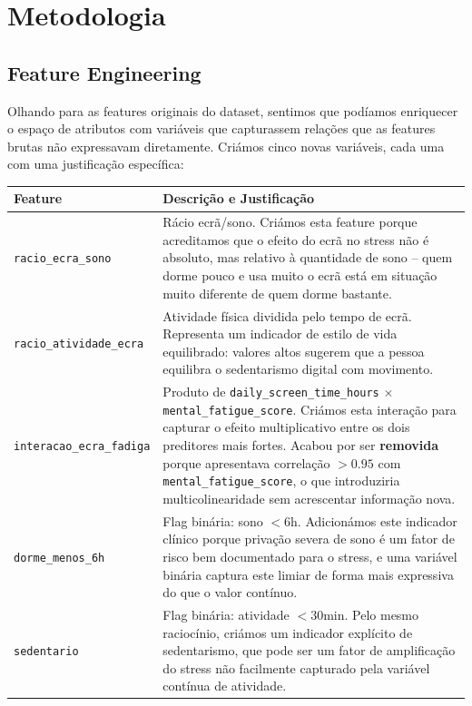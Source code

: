 \documentclass[12pt,a4paper]{article}
\begin{document}
\section{Metodologia}

\subsection{Feature Engineering}

Olhando para as features originais do dataset, sentimos que podíamos enriquecer o espaço
de atributos com variáveis que capturassem relações que as features brutas não expressavam
diretamente. Criámos cinco novas variáveis, cada uma com uma justificação específica:

\begin{longtable}{lp{9cm}}
\toprule
\textbf{Feature} & \textbf{Descrição e Justificação} \\
\midrule
\texttt{racio\_ecra\_sono} & Rácio ecrã/sono. Criámos esta feature porque acreditamos
  que o efeito do ecrã no stress não é absoluto, mas relativo à quantidade de sono --
  quem dorme pouco e usa muito o ecrã está em situação muito diferente de quem dorme
  bastante. \\
\texttt{racio\_atividade\_ecra} & Atividade física dividida pelo tempo de ecrã.
  Representa um indicador de estilo de vida equilibrado: valores altos sugerem que a
  pessoa equilibra o sedentarismo digital com movimento. \\
\texttt{interacao\_ecra\_fadiga} & Produto de \texttt{daily\_screen\_time\_hours} $\times$
  \texttt{mental\_fatigue\_score}. Criámos esta interação para capturar o efeito
  multiplicativo entre os dois preditores mais fortes. Acabou por ser \textbf{removida}
  porque apresentava correlação $>0.95$ com \texttt{mental\_fatigue\_score}, o que
  introduziria multicolinearidade sem acrescentar informação nova. \\
\texttt{dorme\_menos\_6h} & Flag binária: sono $< 6$h. Adicionámos este indicador clínico
  porque privação severa de sono é um fator de risco bem documentado para o stress,
  e uma variável binária captura este limiar de forma mais expressiva do que o valor
  contínuo. \\
\texttt{sedentario} & Flag binária: atividade $< 30$min. Pelo mesmo raciocínio, criámos
  um indicador explícito de sedentarismo, que pode ser um fator de amplificação do stress
  não facilmente capturado pela variável contínua de atividade. \\
\bottomrule
\end{longtable}
\end{document}
